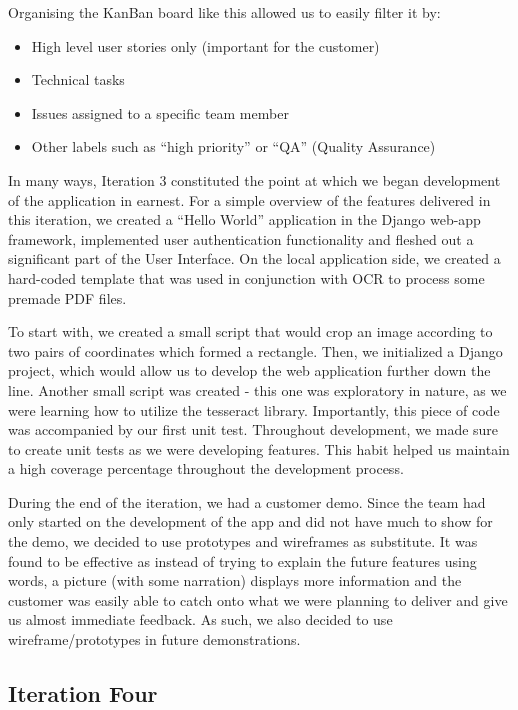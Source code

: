\documentclass{l3proj}
\begin{document}
Organising the KanBan board like this allowed us to easily filter it by:
\begin{itemize}
\item High level user stories only (important for the customer)
\item Technical tasks
\item Issues assigned to a specific team member
\item Other labels such as ``high priority'' or ``QA'' (Quality Assurance)
\end{itemize}

In many ways, Iteration 3 constituted the point at which we began development of the application in earnest. For a simple overview of the features delivered in this iteration, we created a ``Hello World'' application in the Django web-app framework, implemented user authentication functionality and fleshed out a significant part of the User Interface. On the local application side, we created a hard-coded template that was used in conjunction with OCR to process some premade PDF files.

To start with, we created a small script that would crop an image according to two pairs of coordinates which formed a rectangle. Then, we initialized a Django project, which would allow us to develop the web application further down the line. Another small script was created - this one was exploratory in nature, as we were learning how to utilize the tesseract library. Importantly, this piece of code was accompanied by our first unit test. Throughout development, we made sure to create unit tests as we were developing features. This habit helped us maintain a high coverage percentage throughout the development process.

During the end of the iteration, we had a customer demo. Since the team had only started on the development of the app and did not have much to show for the demo, we decided to use prototypes and wireframes as substitute. It was found to be effective as instead of trying to explain the future features using words, a picture (with some narration) displays more information and the customer was easily able to catch onto what we were planning to deliver and give us almost immediate feedback. As such, we also decided to use wireframe/prototypes in future demonstrations.


\subsection{Iteration Four}
\end{document}
